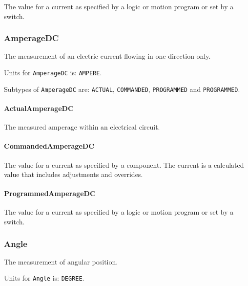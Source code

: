 The value for a current as specified by a logic or motion program or set by a switch.


\subsubsection{AmperageDC}
\label{sec:AmperageDC}



The measurement of an electric current flowing in one direction only.


Units for \texttt{AmperageDC} is: \texttt{AMPERE}.


Subtypes of \texttt{AmperageDC} are: \texttt{ACTUAL}, \texttt{COMMANDED}, \texttt{PROGRAMMED} and \texttt{PROGRAMMED}. 
\FloatBarrier

\paragraph{ActualAmperageDC}\mbox{}
\label{sec:ActualAmperageDC}



The measured amperage within an electrical circuit.


\paragraph{CommandedAmperageDC}\mbox{}
\label{sec:CommandedAmperageDC}



The value for a current as specified by a component. 
The  current is a calculated value that includes adjustments and overrides.


\paragraph{ProgrammedAmperageDC}\mbox{}
\label{sec:ProgrammedAmperageDC}



The value for a current as specified by a logic or motion program or set by a switch.


\subsubsection{Angle}
\label{sec:Angle}



The measurement of angular position.


Units for \texttt{Angle} is: \texttt{DEGREE}.


